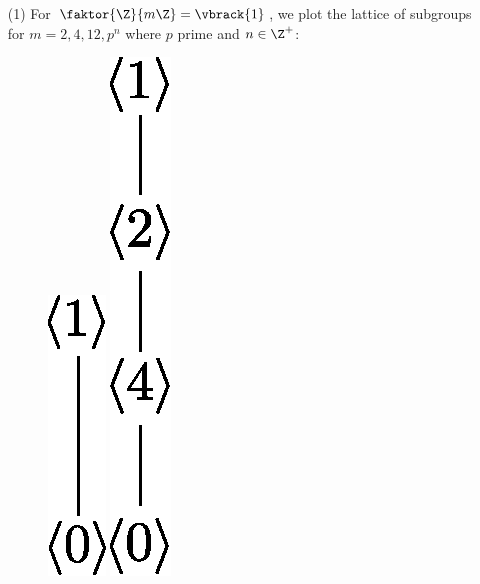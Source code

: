 \begin{example}
    \begin{enumerate}
        \item[(1)] For $\faktor{\Z}{m\Z}=\vbrack{1}$, we plot the lattice of
            subgroups for $m=2,4,12, p^n$ where $p$ prime and $n \in \Z^+$:
            \begin{figure}[h]
                \centering
                \includegraphics[scale = 0.5]{Figures/Chapter2/Z_2_lattice.eps}
                \includegraphics[scale = 0.5]{Figures/Chapter2/Z_8_lattice.eps}

\end{figure}
\end{enumerate}
\end{example}
